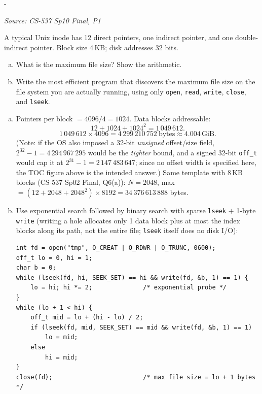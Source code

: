 \documentclass[11pt,a4paper]{article}
\makeatletter
\newcommand{\keepspace}[1]{\par\penalty-100\begingroup
  \setlength{\dimen@}{#1}\dimen@ii\pagegoal\advance\dimen@ii-\pagetotal
  \ifdim\dimen@>\dimen@ii\ifdim\dimen@ii>\z@\vfil\fi\break\fi\endgroup}
\newcounter{qn}[section]
\newenvironment{Qn}[4]{%
  \refstepcounter{qn}\keepspace{7\baselineskip}%
  \begin{tcolorbox}[qboxstyle, title={Q\thesection.\theqn\ \ [#1 \textbar\ #2]\ \ #4}]%
  {\footnotesize\color{g3}\textit{Source: #3}}\par\smallskip%
}{%
  \end{tcolorbox}%
}
\newenvironment{Sol}{%
  \begin{tcolorbox}[sboxstyle, title={Solution}]%
}{%
  \end{tcolorbox}\vspace{0.35em}%
}
\makeatother
\begin{document}
\begin{Qn}{Hard}{Lect 24}{CS-537 Sp10 Final, P1}{Unix inode max size, then probe it with \texttt{lseek}}
A typical Unix inode has 12 direct pointers, one indirect pointer, and one
double-indirect pointer. Block size 4\,KB; disk addresses 32 bits.
\begin{enumerate}[(a)]
\item What is the maximum file size? Show the arithmetic.
\item Write the most efficient program that discovers the maximum file
      size on the file system you are actually running, using only
      \texttt{open}, \texttt{read}, \texttt{write}, \texttt{close}, and
      \texttt{lseek}.
\end{enumerate}
\end{Qn}
\begin{Sol}
\begin{enumerate}[(a)]
\item Pointers per block $= 4096/4 = 1024$. Data blocks addressable:
      \[
        12 + 1024 + 1024^{2} = 1\,049\,612.
      \]
      \[
        1\,049\,612 \times 4096 = 4\,299\,210\,752\ \text{bytes}
        \approx 4.004\,\mathrm{GiB}.
      \]
      (Note: if the OS also imposed a 32-bit \emph{unsigned} offset/size
      field, $2^{32}-1 = 4\,294\,967\,295$ would be the \emph{tighter}
      bound, and a signed 32-bit \texttt{off\_t} would cap it at
      $2^{31}-1 = 2\,147\,483\,647$; since no offset width is specified
      here, the TOC figure above is the intended answer.)
      Same template with 8\,KB blocks (CS-537 Sp02 Final, Q6(a)):
      $N=2048$, max $= (12+2048+2048^{2})\times 8192 = 34\,376\,613\,888$
      bytes.
\item Use exponential search followed by binary search with sparse
      \texttt{lseek} $+$ 1-byte \texttt{write} (writing a hole allocates
      only 1 data block plus at most the index blocks along its path,
      not the entire file; \texttt{lseek} itself does no disk I/O):
\begin{lstlisting}[numbers=none]
int fd = open("tmp", O_CREAT | O_RDWR | O_TRUNC, 0600);
off_t lo = 0, hi = 1;
char b = 0;
while (lseek(fd, hi, SEEK_SET) == hi && write(fd, &b, 1) == 1) {
    lo = hi; hi *= 2;              /* exponential probe */
}
while (lo + 1 < hi) {
    off_t mid = lo + (hi - lo) / 2;
    if (lseek(fd, mid, SEEK_SET) == mid && write(fd, &b, 1) == 1)
        lo = mid;
    else
        hi = mid;
}
close(fd);                         /* max file size = lo + 1 bytes */
\end{lstlisting}
\end{enumerate}
\end{Sol}
\end{document}
